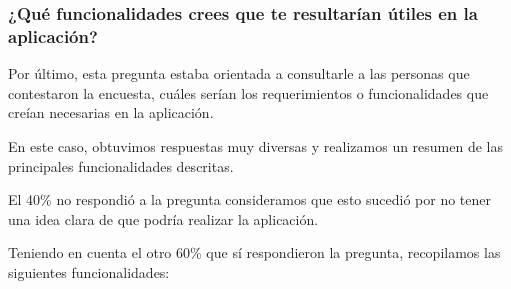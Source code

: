 \documentclass[a4paper,12pt]{article}
\begin{document}
    \subsubsection{¿Qué funcionalidades crees que te resultarían útiles en la aplicación?}
    \par Por último, esta pregunta estaba orientada a consultarle a las personas que contestaron la encuesta, cuáles serían los requerimientos o funcionalidades que creían necesarias en la aplicación.
    \par En este caso, obtuvimos respuestas muy diversas y realizamos un resumen de las principales funcionalidades descritas. 
    \newline
    \newline
    \par El 40\% no respondió a la pregunta consideramos que esto sucedió por no tener una idea clara de que podría realizar la aplicación.
    \par Teniendo en cuenta el otro 60\% que sí respondieron la pregunta, recopilamos las siguientes funcionalidades:
\end{document}

